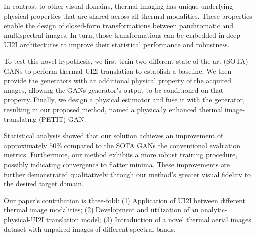 In contrast to other visual domains, thermal imaging has unique underlying physical properties that are shared across all thermal modalities.
These properties enable the design of closed-form transformations between panchromatic and multispectral images. 
In turn, those transformations can be embedded in deep UI2I architectures to improve their statistical performance and robustness.

To test this novel hypothesis, we first train two different state-of-the-art (SOTA) GANs to perform thermal UI2I translation to establish a baseline.
We then provide the generators with an additional physical property of the acquired images, allowing the GANs generator's output to be conditioned on that property.
Finally, we design a physical estimator and fuse it with the generator, resulting in our proposed method, named a physically enhanced thermal image-translating (PETIT) GAN.

Statistical analysis showed that our solution achieves an improvement of approximately $50\%$ compared to the SOTA GANs \wrt the conventional evaluation metrics.
Furthermore, our method exhibits a more robust training procedure, possibly indicating convergence to flatter minima.
These improvements are further demonstrated qualitatively through our method's greater visual fidelity to the desired target domain.

Our paper's contribution is three-fold:
(1) Application of UI2I between different thermal image modalities;
(2) Development and utilization of an analytic-physical-UI2I translation model;
(3) Introduction of a novel thermal aerial images dataset with unpaired images of different spectral bands.